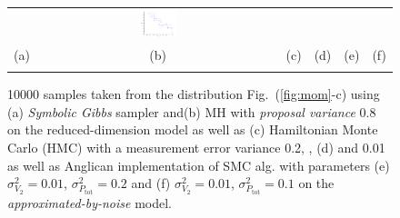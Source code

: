 \documentclass{article} %
\newcommand{\nn}{0.16}
\begin{document}
\begin{figure}[t!]
\begin{center}
\begin{tabular}{cccccc}
& \hspace{-3mm} \includegraphics[width=\nn\textwidth]{Figs2/col_c_ang_10000_01_001}
\vspace{-1.5mm}
\\
   \hspace{-4mm} \footnotesize(a) 
& \hspace{-2mm} \footnotesize(b) 
& \hspace{-3mm} \footnotesize(c) 
&\hspace{-1mm} \footnotesize(d) 
&\hspace{-1mm} \footnotesize(e) 
&\hspace{-1mm} \footnotesize(f)\\
\multicolumn{6}{c}{}
\end{tabular}
\end{center}
\vspace{-8mm}
\caption{\footnotesize
10000 samples taken from the distribution Fig.~(\ref{fig:mom}-c)
using (a) \emph{Symbolic Gibbs} sampler and(b) MH with \emph{proposal variance} 0.8 
on the reduced-dimension model as well as  
(c) Hamiltonian Monte Carlo (HMC) with a measurement error variance 0.2, 
, (d) and 0.01 as well as Anglican implementation of SMC alg. with %
parameters (e)
$\sigma^2_{V_2} = 0.01$, $\sigma^2_{P_\text{tot}} = 0.2$ and 
(f) $\sigma^2_{V_2} = 0.01$, $\sigma^2_{P_\text{tot}} = 0.1$
on the \emph{approximated-by-noise} model.
}
\label{fig:mom2}
\vspace{-4mm}
\end{figure}
\end{document}
